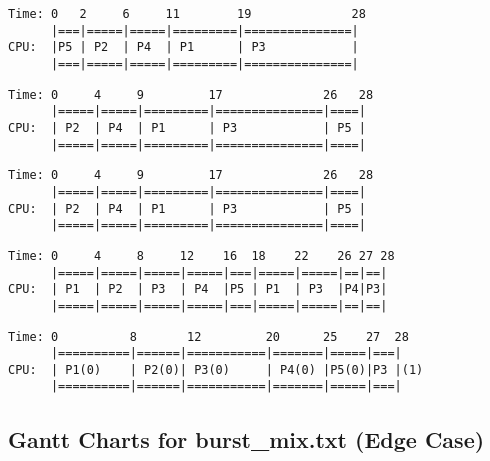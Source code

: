 \documentclass[12pt]{article}
\begin{document}
\begin{lstlisting}[style=ganttstyle, caption={Gantt Chart: SRTF - Preemptive SJF (arrival0.txt)}, label={lst:gantt_srtf_arrival0}]
Time: 0   2     6     11        19              28
      |===|=====|=====|=========|===============|
CPU:  |P5 | P2  | P4  | P1      | P3            |
      |===|=====|=====|=========|===============|
\end{lstlisting}

\begin{lstlisting}[style=ganttstyle, caption={Gantt Chart: Priority - Non-Preemptive (arrival0.txt)}, label={lst:gantt_prio_np_arrival0}]
Time: 0     4     9         17              26   28
      |=====|=====|=========|===============|====|
CPU:  | P2  | P4  | P1      | P3            | P5 |
      |=====|=====|=========|===============|====|
\end{lstlisting}

\begin{lstlisting}[style=ganttstyle, caption={Gantt Chart: Priority - Preemptive (arrival0.txt)}, label={lst:gantt_prio_p_arrival0}]
Time: 0     4     9         17              26   28
      |=====|=====|=========|===============|====|
CPU:  | P2  | P4  | P1      | P3            | P5 |
      |=====|=====|=========|===============|====|
\end{lstlisting}

\begin{lstlisting}[style=ganttstyle, caption={Gantt Chart: Round Robin, Q=4 (arrival0.txt)}, label={lst:gantt_rr_arrival0}]
Time: 0     4     8     12    16  18    22    26 27 28
      |=====|=====|=====|=====|===|=====|=====|==|==|
CPU:  | P1  | P2  | P3  | P4  |P5 | P1  | P3  |P4|P3|
      |=====|=====|=====|=====|===|=====|=====|==|==|
\end{lstlisting}

\begin{lstlisting}[style=ganttstyle, caption={Gantt Chart: MLFQ (arrival0.txt) Queue number is parentheses}, label={lst:gantt_mlfq_arrival0}]
Time: 0          8       12         20      25    27  28
      |==========|======|===========|=======|=====|===|
CPU:  | P1(0)    | P2(0)| P3(0)     | P4(0) |P5(0)|P3 |(1)
      |==========|======|===========|=======|=====|===|
\end{lstlisting}

\subsection{Gantt Charts for burst\_mix.txt (Edge Case)}
\end{document}

